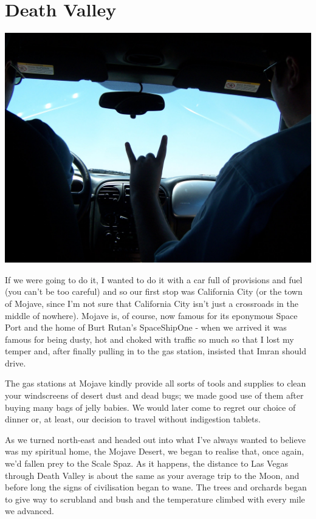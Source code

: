 \documentclass[a5paper,titlepage,11pt]{book}
\begin{document}
\section*{Death Valley}
\begin{center}\includegraphics[width=\textwidth]{gfx/100_1298}\end{center}
If we were going to do it, I wanted to do it with a car full of provisions and fuel (you can't be too careful) and so our first stop was California City (or the town of Mojave, since I'm not sure that California City isn't just a crossroads in the middle of nowhere).  Mojave is, of course, now famous for its eponymous Space Port and the home of Burt Rutan's SpaceShipOne - when we arrived it was famous for being dusty, hot and choked with traffic so much so that I lost my temper and, after finally pulling in to the gas station, insisted that Imran should drive.

The gas stations at Mojave kindly provide all sorts of tools and supplies to clean your windscreens of desert dust and dead bugs; we made good use of them after buying many bags of jelly babies.  We would later come to regret our choice of dinner or, at least, our decision to travel without indigestion tablets.

As we turned north-east and headed out into what I've always wanted to believe was my spiritual home, the Mojave Desert, we began to realise that, once again, we'd fallen prey to the Scale Spaz.  As it happens, the distance to Las Vegas through Death Valley is about the same as your average trip to the Moon, and before long the signs of civilisation began to wane.  The trees and orchards began to give way to scrubland and bush and the temperature climbed with every mile we advanced.
\end{document}
